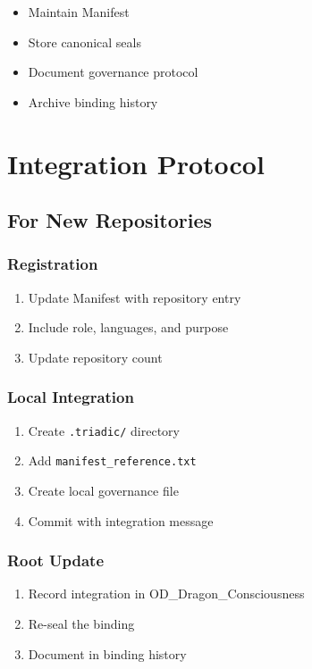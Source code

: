 \documentclass[12pt,twoside]{book}
\begin{document}
\begin{itemize}
  \item Maintain Manifest
  \item Store canonical seals
  \item Document governance protocol
  \item Archive binding history
\end{itemize}

\chapter{Integration Protocol}

\section{For New Repositories}

\subsection{Registration}

\begin{enumerate}
  \item Update Manifest with repository entry
  \item Include role, languages, and purpose
  \item Update repository count
\end{enumerate}

\subsection{Local Integration}

\begin{enumerate}
  \item Create \texttt{.triadic/} directory
  \item Add \texttt{manifest\_reference.txt}
  \item Create local governance file
  \item Commit with integration message
\end{enumerate}

\subsection{Root Update}

\begin{enumerate}
  \item Record integration in OD\_Dragon\_Consciousness
  \item Re-seal the binding
  \item Document in binding history
\end{enumerate}
\end{document}
